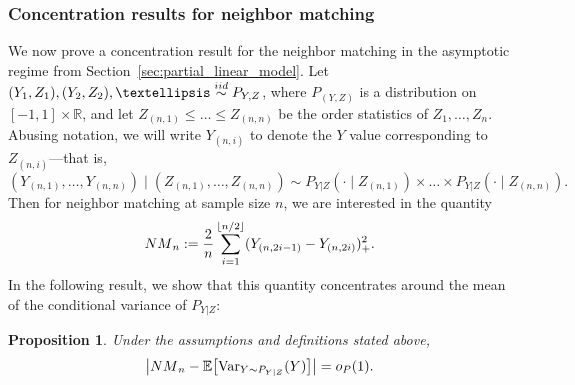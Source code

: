 \documentclass[12pt]{article}
\newtheorem{proposition}[theorem]{Proposition}
\newcommand{\R}{\mathbb{R}}
\newcommand{\VPst}[2]{\mathrm{Var}_{{#1}}({#2})}
\newcommand{\iidsim}{\stackrel{\textnormal{iid}}{\sim}}
\begin{document}
\subsubsection{Concentration results for neighbor matching}\label{app:conc-neighbour}
We now prove a concentration result for the neighbor matching in the asymptotic regime from Section~\ref{sec:partial_linear_model}.
Let $(Y_1,Z_1),(Y_2,Z_2),\dots\iidsim P_{Y,Z}$, where $P_{(Y,Z)}$ is a distribution on $[-1,1]\times\R$, and let $Z_{(n,1)}\leq \dots \leq Z_{(n,n)}$ be the order statistics of $Z_1,\dots,Z_n$. Abusing notation, we will write $Y_{(n,i)}$ to denote the $Y$ value corresponding to $Z_{(n,i)}$---that is, 
\[(Y_{(n,1)},\dots,Y_{(n,n)})\mid (Z_{(n,1)},\dots,Z_{(n,n)})\sim P_{Y|Z}(\cdot\mid Z_{(n,1)})\times\dots \times P_{Y|Z}(\cdot\mid Z_{(n,n)}).\]
Then for neighbor matching at sample size $n$, we are interested in the quantity
\[
{\rm NM}_n  := \frac{2}{n}\sum_{i=1}^{\lfloor n/2\rfloor} (Y_{(n,2i-1)} - Y_{(n,2i)})^2_+.
\]
In the following result, we show that this quantity concentrates around the mean of the conditional variance of $P_{Y|Z}$:
\begin{proposition}\label{lem:neighbour_matching_conc}
Under the assumptions and definitions stated above,
\[
\bigl|{\rm NM}_n - \mathbb{E}\bigl[\VPst{Y\sim P_{Y\mid Z}}{Y}\bigr]\bigr| = {\rm o}_P(1).
\]
\end{proposition}
\end{document}
